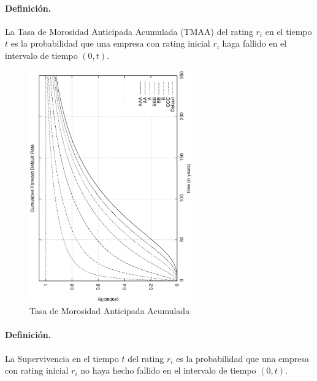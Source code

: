 \paragraph{Definici\'on.} La Tasa de Morosidad Anticipada Acumulada (TMAA) 
del rating $r_i$ en el tiempo $t$ es la probabilidad que una empresa con rating 
inicial $r_i$ haga fallido en el intervalo de tiempo $(0,t)$.

\begin{figure}[!hb]
\begin{center}
\includegraphics[height=10cm, angle=-90]{./images/tmaa.ps}
\caption{Tasa de Morosidad Anticipada Acumulada}
\label{tmaa}
\end{center}
\end{figure}

\paragraph{Definici\'on.} La Supervivencia en el tiempo $t$ del rating $r_i$ 
es la probabilidad que una empresa con rating inicial $r_i$ no haya hecho 
fallido en el intervalo de tiempo $(0,t)$.

